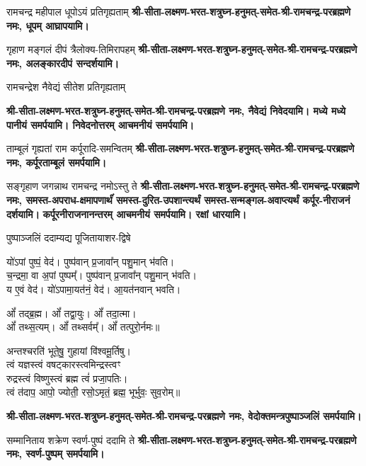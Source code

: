 \begin{center}

\renewcommand{\devAya}{श्री-सीता-लक्ष्मण-भरत-शत्रुघ्न-हनुमत्-समेत-श्री-रामचन्द्र-परब्रह्मणे नमः,}


{रामचन्द्र महीपाल धूपोऽयं प्रतिगृह्यताम्}
\textbf{\devAya{} धूपम् आघ्रापयामि।}

{गृहाण मङ्गलं दीपं त्रैलोक्य-तिमिरापहम्}
\textbf{\devAya{} अलङ्कारदीपं सन्दर्शयामि।}

{रामचन्द्रेश नैवेद्यं सीतेश प्रतिगृह्यताम्}

\textbf{\devAya{} नैवेद्यं निवेदयामि। मध्ये मध्ये पानीयं समर्पयामि। निवेदनोत्तरम् आचमनीयं समर्पयामि।}

{ताम्बूलं गृह्यतां राम कर्पूरादि-समन्वितम्}
\textbf{\devAya{} कर्पूरताम्बूलं समर्पयामि।}

{सङ्गृहाण जगन्नाथ रामचन्द्र नमोऽस्तु ते}
\textbf{\devAya{} समस्त-अपराध-क्षमापणार्थंं समस्त-दुरित-उपशान्त्यर्थं समस्त-सन्मङ्गल-अवाप्त्यर्थं कर्पूर-नीराजनं दर्शयामि।}
\textbf{कर्पूरनीराजनानन्तरम् आचमनीयं समर्पयामि। रक्षां धारयामि।}

{पुष्पाञ्जलिं ददाम्यद्य पूजितायाशर-द्विषे}

यो॑ऽपां पुष्पं॒ वेद॑। पुष्प॑वान् प्र॒जावा᳚न् पशु॒मान् भ॑वति।\\
च॒न्द्रमा॒ वा अ॒पां पुष्पम्᳚। पुष्प॑वान् प्र॒जावा᳚न् पशु॒मान् भ॑वति।\\
य ए॒वं वेद॑। यो॑ऽपामा॒यत॑नं॒ वेद॑। आ॒यत॑नवान् भवति।\medskip

ओं᳚ तद्ब्र॒ह्म। ओं᳚ तद्वा॒युः। ओं᳚ तदा॒त्मा।\\ ओं᳚ तथ्स॒त्यम्‌।
ओं᳚ तथ्सर्वम्᳚‌। ओं᳚ तत्पुरो॒र्नमः॥\medskip

अन्तश्चरति॑ भूते॒षु॒ गुहायां वि॑श्वमू॒र्तिषु।\\
त्वं यज्ञस्त्वं वषट्कारस्त्वमिन्द्रस्त्वꣳ\\ रुद्रस्त्वं विष्णुस्त्वं ब्रह्म त्वं॑ प्रजा॒पतिः।\\
त्वं त॑दाप॒ आपो॒ ज्योती॒ रसो॒ऽमृतं॒ ब्रह्म॒ भूर्भुवः॒ सुव॒रोम्‌॥

\textbf{\devAya{} वेदोक्तमन्त्रपुष्पाञ्जलिं समर्पयामि।}

{सम्मानिताय शक्रेण स्वर्ण-पुष्पं ददामि ते}
\textbf{\devAya{} स्वर्ण-पुष्पम् समर्पयामि।}


\end{center}
